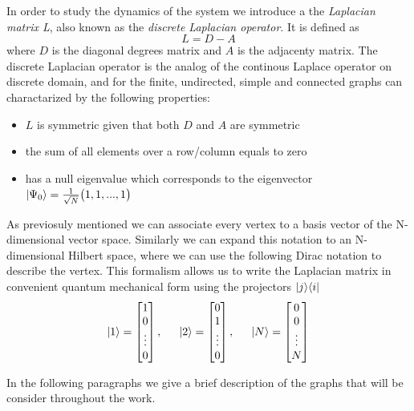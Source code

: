 In order to study the dynamics of the system we introduce a the \textit{Laplacian matrix L}, also known as the \textit{discrete Laplacian operator}. It is defined as
\begin{equation}
    L = D-A
\end{equation}
where $D$ is the diagonal degrees matrix and $A$ is the adjacenty matrix. The discrete Laplacian operator is the analog of the continous Laplace operator on discrete domain, and for the finite, undirected, simple and connected graphs can charactarized by the following properties:
\begin{itemize}
  \item $L$ is symmetric given that both $D$ and $A$ are symmetric
  \item the sum of all elements over a row/column equals to zero
  \item has a null eigenvalue which corresponds to the eigenvector ${|{\Psi_0}\rangle} = \frac{1}{\sqrt{N}}\big(1,1,...,1\big)$
\end{itemize}
As previosuly mentioned we can associate every vertex to a basis vector of the N-dimensional vector space. Similarly we can expand this notation to an N-dimensional Hilbert space, where we can use the following Dirac notation to describe the vertex. This formalism allows us to write the Laplacian matrix in convenient quantum mechanical form using the projectors ${|{j}\rangle}{\langle{i}|}$
\begin{equation}
  {|{1}\rangle}=\begin{bmatrix} 1 \\ 0 \\ \vdots \\ 0\end{bmatrix}, \hspace{15pt}{|{2}\rangle}=\begin{bmatrix}0\\1\\\vdots\\0\end{bmatrix}, \hspace{15pt}{|{N}\rangle}=\begin{bmatrix}0\\0\\\vdots\\N\end{bmatrix}
\end{equation}


In the following paragraphs we give a brief description of the graphs that will be consider throughout the work. \\

